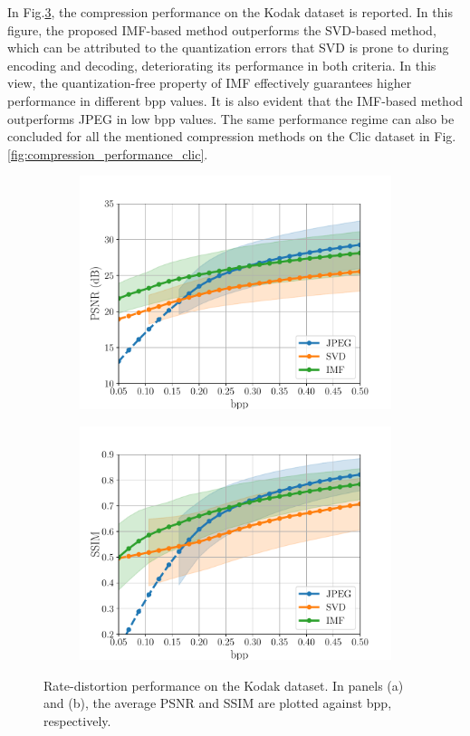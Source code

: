 In Fig.\ref{fig:compression_performance_kodak}, the compression performance on the Kodak dataset is reported. 
In this figure, the proposed IMF-based method outperforms the SVD-based method, which can be attributed to the quantization errors that SVD is prone to during encoding and decoding, deteriorating its performance in both criteria. In this view, the quantization-free property of IMF effectively guarantees higher performance in different bpp values.
It is also evident that the IMF-based method outperforms JPEG in low bpp values. The same performance regime can also be concluded for all the mentioned compression methods on the Clic dataset in Fig.\ref{fig:compression_performance_clic}.
\begin{figure}[t]
	\centering
	\begin{subfigure}{.5\textwidth}
		\centering
		\includegraphics[width=.95\textwidth]{figures/comparison_kodak_psnr.pdf}
		\caption{}
		\label{fig: psnr-vs-bpp kodak}
	\end{subfigure}%
	\begin{subfigure}{.5\textwidth}
		\centering
		\includegraphics[width=.95\textwidth]{figures/comparison_kodak_ssim.pdf}
		\caption{}
		\label{fig: ssim-vs-bpp kodak}
	\end{subfigure}
	\caption{Rate-distortion performance on the Kodak dataset. In panels (a) and (b), the average PSNR and SSIM are plotted against bpp, respectively.}
	\label{fig:compression_performance_kodak}
\end{figure}

